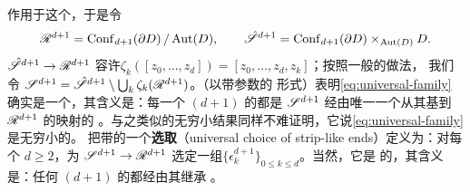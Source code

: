 作用于这个\trConfigurationSpace，于是令
\begin{equation}\label{eq:universal-disc-base}
\mathscr{R}^{d+1}=\mathrm{Conf}_{d+1}(\partial D)\,/\,\mathrm{Aut}(D),
\qquad
\hat{\mathscr{S}}^{d+1}=\mathrm{Conf}_{d+1}(\partial D)\times_{\mathrm{Aut}(D)}D.
\end{equation}
\trProjection{}$\hat{\mathscr{S}}^{d+1}\to\mathscr{R}^{d+1}$ 容许\trSection{}$\zeta_k([z_0,\ldots,z_d])=[z_0,\ldots,z_d,z_k]$；按照一般的做法，
我们令 $\mathscr{S}^{d+1}=\hat{\mathscr{S}}^{d+1}\setminus\bigcup_k\zeta_k(\mathscr{R}^{d+1})$。\trRiemann\trUniformization（以带参数的
形式）表明\eqref{eq:universal-family} 确实是一个\trUniversal\trFamily，其含义是：每一个 $(d+1)$%
\trPointedDisc{}的\trFamily{}都是 $\mathscr{S}^{d+1}$ 经由唯一一个从其基到 $\mathscr{R}^{d+1}$ 的\trSmooth{}映射的%
\trPullback。与之类似的无穷小结果同样不难证明，它说\eqref{eq:universal-family} 是无穷小\trMiniversal{}的。
把带\trStriplikeEnd{}的一个\textbf{\trUniversal{}选取}（universal choice of strip-like ends）定义为：对每个
$d\ge 2$，为 $\mathscr{S}^{d+1}\to\mathscr{R}^{d+1}$ 选定一组\trStriplikeEnd{}$\{\epsilon^{d+1}_{k}\}_{0\le k\le d}$。当然，它是%
\trUniversal{}的，其含义是：任何 $(d+1)$ \trPointedDisc{}的\trFamily{}都经由其\trClassifyingMap{}继承%
\trStriplikeEnd。
